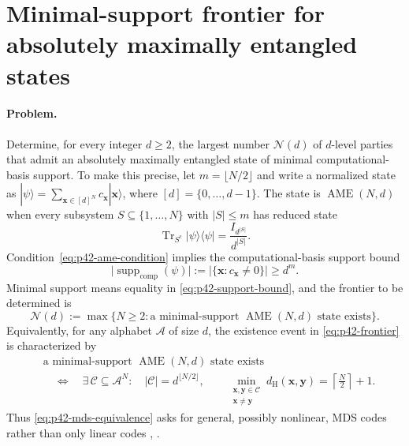 \section{Minimal-support frontier for absolutely maximally entangled states}
\label{sec:op_7a17786328198e24}

\paragraph{Problem.}
Determine, for every integer $d\geq 2$, the largest number $\mathcal N(d)$ of
$d$-level parties that admit an absolutely maximally entangled state of
minimal computational-basis support.  To make this precise, let
$m=\lfloor N/2\rfloor$ and write a normalized state as
$|\psi\rangle=\sum_{\boldsymbol{x}\in[d]^N}c_{\boldsymbol{x}}
|\boldsymbol{x}\rangle$, where $[d]=\{0,\ldots,d-1\}$.  The state is
$\operatorname{AME}(N,d)$ when every subsystem $S\subseteq\{1,\ldots,N\}$
with $|S|\leq m$ has reduced state
\begin{equation}
  \operatorname{Tr}_{S^{\mathrm c}}|\psi\rangle\!\langle\psi|
  =\frac{I_{d^{|S|}}}{d^{|S|}}.
  \label{eq:p42-ame-condition}
\end{equation}
Condition~\eqref{eq:p42-ame-condition} implies the computational-basis
support bound
\begin{equation}
  \bigl|\operatorname{supp}_{\mathrm{comp}}(\psi)\bigr|
  :=\bigl|\{\boldsymbol{x}:c_{\boldsymbol{x}}\neq0\}\bigr|
  \geq d^{m}.
  \label{eq:p42-support-bound}
\end{equation}
Minimal support means equality in \eqref{eq:p42-support-bound}, and the
frontier to be determined is
\begin{equation}
  \mathcal N(d):=\max\bigl\{N\geq2:\text{a minimal-support }
  \operatorname{AME}(N,d)\text{ state exists}\bigr\}.
  \label{eq:p42-frontier}
\end{equation}
Equivalently, for any alphabet $\mathcal A$ of size $d$, the existence event
in \eqref{eq:p42-frontier} is characterized by
\begin{equation}
  \begin{split}
  &\text{a minimal-support }\operatorname{AME}(N,d)\text{ state exists}
  \\
  &\quad\Longleftrightarrow\quad
  \exists\,\mathcal C\subseteq\mathcal A^N:\quad
  |\mathcal C|=d^{\lfloor N/2\rfloor},\qquad
  \min_{\substack{\boldsymbol{x},\boldsymbol{y}\in\mathcal C\\
                   \boldsymbol{x}\neq\boldsymbol{y}}}
  d_{\mathrm H}(\boldsymbol{x},\boldsymbol{y})
  =\left\lceil\frac N2\right\rceil+1.
  \end{split}
  \label{eq:p42-mds-equivalence}
\end{equation}
Thus \eqref{eq:p42-mds-equivalence} asks for general, possibly nonlinear,
MDS codes rather than only linear codes
,
.

